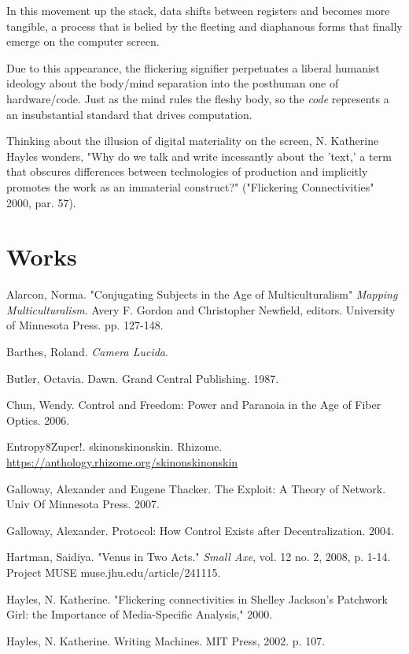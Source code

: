 \documentclass[11pt]{article}
\begin{document}
\begin{enumerate}
In this movement up the stack, data shifts
between registers and becomes more tangible, a process that is belied
by the fleeting and diaphanous forms that finally emerge on the
computer screen.

Due to this appearance, the flickering signifier perpetuates a liberal
humanist ideology about the body/mind separation into the posthuman
one of hardware/code. Just as the mind rules the fleshy body, so the
\emph{code} represents a an insubstantial standard that drives computation.

Thinking about the illusion of digital materiality on the screen,
N. Katherine Hayles wonders, "Why do we talk and write incessantly
about the 'text,' a term that obscures differences between
technologies of production and implicitly promotes the work as an
immaterial construct?" ("Flickering Connectivities" 2000,
par. 57).
\end{enumerate}




\section{Works}
\label{sec:org15c0181}
Alarcon, Norma. "Conjugating Subjects in the Age of Multiculturalism"
\emph{Mapping Multiculturalism}. Avery F. Gordon and Christopher Newfield,
editors. University of Minnesota Press. pp. 127-148.

Barthes, Roland. \emph{Camera Lucida}.

Butler, Octavia. Dawn. Grand Central Publishing. 1987.

Chun, Wendy. Control and Freedom: Power and Paranoia in the Age of Fiber Optics. 2006.

Entropy8Zuper!. skinonskinonskin. Rhizome. \url{https://anthology.rhizome.org/skinonskinonskin} 

Galloway, Alexander and Eugene Thacker. The Exploit: A Theory of Network. Univ Of 
Minnesota Press. 2007. 

Galloway, Alexander. Protocol: How Control Exists after
Decentralization. 2004.

Hartman, Saidiya. "Venus in Two Acts." \emph{Small Axe}, vol. 12 no. 2,
   2008, p. 1-14. Project MUSE muse.jhu.edu/article/241115.

Hayles, N. Katherine. "Flickering connectivities in Shelley Jackson's
Patchwork Girl: the Importance of Media-Specific Analysis," 2000.

Hayles, N. Katherine. Writing Machines. MIT Press, 2002. p. 107.
\end{document}
